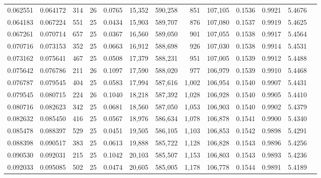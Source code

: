 \begin{tabular}{rrrrrrrrrrrrr}
0.062551 & 0.064172 &   314 &  26 &                                     0.0765 &  15,352 & 590,258 &     851 & 107,105 & 0.1536 & 0.9921 & 5.4676 \\
0.064183 & 0.067224 &   551 &  25 &                                     0.0434 &  15,903 & 589,707 &     876 & 107,080 & 0.1537 & 0.9919 & 5.4625 \\
0.067261 & 0.070714 &   657 &  25 &                                     0.0367 &  16,560 & 589,050 &     901 & 107,055 & 0.1538 & 0.9917 & 5.4564 \\
0.070716 & 0.073153 &   352 &  25 &                                     0.0663 &  16,912 & 588,698 &     926 & 107,030 & 0.1538 & 0.9914 & 5.4531 \\
0.073162 & 0.075641 &   467 &  25 &                                     0.0508 &  17,379 & 588,231 &     951 & 107,005 & 0.1539 & 0.9912 & 5.4488 \\
0.075642 & 0.076786 &   211 &  26 &                                     0.1097 &  17,590 & 588,020 &     977 & 106,979 & 0.1539 & 0.9910 & 5.4468 \\
0.076787 & 0.079545 &   404 &  25 &                                     0.0583 &  17,994 & 587,616 &   1,002 & 106,954 & 0.1540 & 0.9907 & 5.4431 \\
0.079545 & 0.080715 &   224 &  26 &                                     0.1040 &  18,218 & 587,392 &   1,028 & 106,928 & 0.1540 & 0.9905 & 5.4410 \\
0.080716 & 0.082623 &   342 &  25 &                                     0.0681 &  18,560 & 587,050 &   1,053 & 106,903 & 0.1540 & 0.9902 & 5.4379 \\
0.082632 & 0.085450 &   416 &  25 &                                     0.0567 &  18,976 & 586,634 &   1,078 & 106,878 & 0.1541 & 0.9900 & 5.4340 \\
0.085478 & 0.088397 &   529 &  25 &                                     0.0451 &  19,505 & 586,105 &   1,103 & 106,853 & 0.1542 & 0.9898 & 5.4291 \\
0.088398 & 0.090517 &   383 &  25 &                                     0.0613 &  19,888 & 585,722 &   1,128 & 106,828 & 0.1543 & 0.9896 & 5.4256 \\
0.090530 & 0.092031 &   215 &  25 &                                     0.1042 &  20,103 & 585,507 &   1,153 & 106,803 & 0.1543 & 0.9893 & 5.4236 \\
0.092033 & 0.095085 &   502 &  25 &                                     0.0474 &  20,605 & 585,005 &   1,178 & 106,778 & 0.1544 & 0.9891 & 5.4189 \\

\end{tabular}
